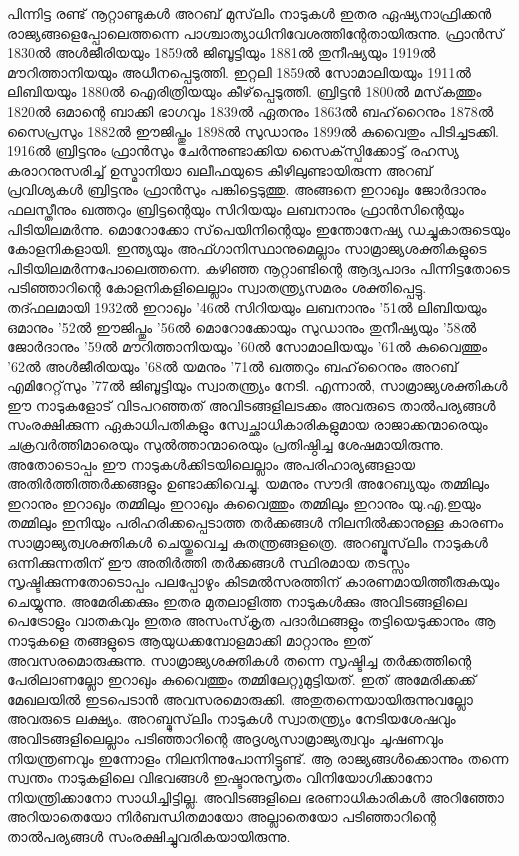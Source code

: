 പിന്നിട്ട രണ്ട് നൂറ്റാണ്ടുകള്‍ അറബ് മുസ്‌ലിം നാടുകള്‍ ഇതര ഏഷ്യനാഫ്രിക്കന്‍ രാജ്യങ്ങളെപ്പോലെത്തന്നെ പാശ്ചാത്യാധിനിവേശത്തിന്റേതായിരുന്നു. ഫ്രാന്‍സ് 1830ല്‍ അള്‍ജീരിയയും 1859ല്‍ ജിബൂട്ടിയും 1881ല്‍ തുനീഷ്യയും 1919ല്‍ മൗറിത്താനിയയും അധീനപ്പെടുത്തി. ഇറ്റലി 1859ല്‍ സോമാലിയയും 1911ല്‍ ലിബിയയും 1880ല്‍ ഐരിത്രിയയും കീഴ്‌പ്പെടുത്തി. ബ്രിട്ടന്‍ 1800ല്‍ മസ്‌കത്തും 1820ല്‍ ഒമാന്റെ ബാക്കി ഭാഗവും 1839ല്‍ ഏതനും 1863ല്‍ ബഹ്‌റൈനും 1878ല്‍ സൈപ്രസും 1882ല്‍ ഈജിപ്തും 1898ല്‍ സുഡാനും 1899ല്‍ കുവൈതും പിടിച്ചടക്കി. 1916ല്‍ ബ്രിട്ടനും ഫ്രാന്‍സും ചേര്‍ന്നുണ്ടാക്കിയ സൈക്‌സ്പിക്കോട്ട് രഹസ്യ കരാറനുസരിച്ച് ഉസ്മാനിയാ ഖലീഫയുടെ കീഴിലുണ്ടായിരുന്ന അറബ് പ്രവിശ്യകള്‍ ബ്രിട്ടനും ഫ്രാന്‍സും പങ്കിട്ടെടുത്തു. അങ്ങനെ ഇറാഖും ജോര്‍ദാനും ഫലസ്തീനും ഖത്തറും ബ്രിട്ടന്റെയും സിറിയയും ലബനാനും ഫ്രാന്‍സിന്റെയും പിടിയിലമര്‍ന്നു. മൊറോക്കോ സ്‌പെയിനിന്റെയും ഇന്തോനേഷ്യ ഡച്ചുകാരുടെയും കോളനികളായി. ഇന്ത്യയും അഫ്ഗാനിസ്ഥാനുമെല്ലാം സാമ്രാജ്യശക്തികളുടെ പിടിയിലമര്‍ന്നപോലെത്തന്നെ.
കഴിഞ്ഞ നൂറ്റാണ്ടിന്റെ ആദ്യപാദം പിന്നിട്ടതോടെ പടിഞ്ഞാറിന്റെ കോളനികളിലെല്ലാം സ്വാതന്ത്യ്രസമരം ശക്തിപ്പെട്ടു. തദ്ഫലമായി 1932ല്‍ ഇറാഖും '46ല്‍ സിറിയയും ലബനാനും '51ല്‍ ലിബിയയും ഒമാനും '52ല്‍ ഈജിപ്തും '56ല്‍ മൊറോക്കോയും സുഡാനും തുനീഷ്യയും '58ല്‍ ജോര്‍ദാനും '59ല്‍ മൗറിത്താനിയയും '60ല്‍ സോമാലിയയും '61ല്‍ കുവൈത്തും '62ല്‍ അള്‍ജീരിയയും '68ല്‍ യമനും '71ല്‍ ഖത്തറും ബഹ്‌റൈനും അറബ് എമിറേറ്റ്‌സും '77ല്‍ ജിബൂട്ടിയും സ്വാതന്ത്യ്രം നേടി.
എന്നാല്‍, സാമ്രാജ്യശക്തികള്‍ ഈ നാടുകളോട് വിടപറഞ്ഞത് അവിടങ്ങളിലടക്കം അവരുടെ താല്‍പര്യങ്ങള്‍ സംരക്ഷിക്കുന്ന ഏകാധിപതികളും സ്വേച്ഛാധികാരികളുമായ രാജാക്കന്മാരെയും ചക്രവര്‍ത്തിമാരെയും സുല്‍ത്താന്മാരെയും പ്രതിഷ്ഠിച്ച ശേഷമായിരുന്നു. അതോടൊപ്പം ഈ നാടുകള്‍ക്കിടയിലെല്ലാം അപരിഹാര്യങ്ങളായ അതിര്‍ത്തിത്തര്‍ക്കങ്ങളും ഉണ്ടാക്കിവെച്ചു. യമനും സൗദി അറേബ്യയും തമ്മിലും ഇറാനും ഇറാഖും തമ്മിലും ഇറാഖും കുവൈത്തും തമ്മിലും ഇറാനും യു.എ.ഇയും തമ്മിലും ഇനിയും പരിഹരിക്കപ്പെടാത്ത തര്‍ക്കങ്ങള്‍ നിലനില്‍ക്കാനുള്ള കാരണം സാമ്രാജ്യത്വശക്തികള്‍ ചെയ്തുവെച്ച കുതന്ത്രങ്ങളത്രെ. അറബ്മുസ്‌ലിം നാടുകള്‍ ഒന്നിക്കുന്നതിന് ഈ അതിര്‍ത്തി തര്‍ക്കങ്ങള്‍ സ്ഥിരമായ തടസ്സം സൃഷ്ടിക്കുന്നതോടൊപ്പം പലപ്പോഴും കിടമല്‍സരത്തിന് കാരണമായിത്തീരുകയും ചെയ്യുന്നു. അമേരിക്കക്കും ഇതര മുതലാളിത്ത നാടുകള്‍ക്കും അവിടങ്ങളിലെ പെട്രോളും വാതകവും ഇതര അസംസ്‌കൃത പദാര്‍ഥങ്ങളും തട്ടിയെടുക്കാനും ആ നാടുകളെ തങ്ങളുടെ ആയുധക്കമ്പോളമാക്കി മാറ്റാനും ഇത് അവസരമൊരുക്കുന്നു.
സാമ്രാജ്യശക്തികള്‍ തന്നെ സൃഷ്ടിച്ച തര്‍ക്കത്തിന്റെ പേരിലാണല്ലോ ഇറാഖും കുവൈത്തും തമ്മിലേറ്റുമുട്ടിയത്. ഇത് അമേരിക്കക്ക് മേഖലയില്‍ ഇടപെടാന്‍ അവസരമൊരുക്കി. അതുതന്നെയായിരുന്നുവല്ലോ അവരുടെ ലക്ഷ്യം. അറബ്മുസ്‌ലിം നാടുകള്‍ സ്വാതന്ത്യ്രം നേടിയശേഷവും അവിടങ്ങളിലെല്ലാം പടിഞ്ഞാറിന്റെ അദൃശ്യസാമ്രാജ്യത്വവും ചൂഷണവും നിയന്ത്രണവും ഇന്നോളം നിലനിന്നുപോന്നിട്ടുണ്ട്. ആ രാജ്യങ്ങള്‍ക്കൊന്നും തന്നെ സ്വന്തം നാടുകളിലെ വിഭവങ്ങള്‍ ഇഷ്ടാനുസൃതം വിനിയോഗിക്കാനോ നിയന്ത്രിക്കാനോ സാധിച്ചിട്ടില്ല. അവിടങ്ങളിലെ ഭരണാധികാരികള്‍ അറിഞ്ഞോ അറിയാതെയോ നിര്‍ബന്ധിതമായോ അല്ലാതെയോ പടിഞ്ഞാറിന്റെ താല്‍പര്യങ്ങള്‍ സംരക്ഷിച്ചുവരികയായിരുന്നു.
